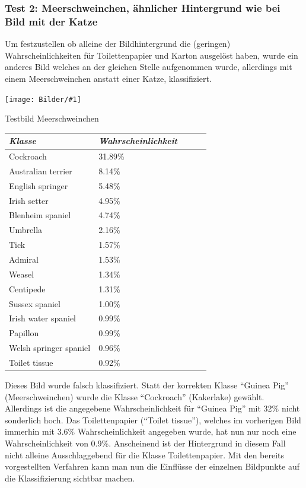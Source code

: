 \documentclass[
  12pt, %
  a4paper, %
  oneside, %
  openany, 
  numbers=noenddot, %
  BCOR=5mm, %
  parskip=half*, %
  thesis, %
]{bfhbook}
\newcommand{\imgText}[3]{
\begin{center}
    \begin{minipage}[t]{0.6\textwidth}
    		\vspace{0pt}
		\texttt{[image: Bilder/\#1]}
		\caption{#2}
	\end{minipage}\hfill
    \begin{minipage}[t]{0.4\textwidth}
    		\vspace{5pt}
  		#3
    \end{minipage}
\end{center}
}
\begin{document}
\subsubsection*{Test 2: Meerschweinchen, ähnlicher Hintergrund wie bei Bild mit der Katze}
Um festzustellen ob alleine der Bildhintergrund die (geringen) Wahrscheinlichkeiten für Toilettenpapier und Karton ausgelöst haben, wurde ein anderes Bild welches an der gleichen Stelle aufgenommen wurde, allerdings mit einem Meerschweinchen anstatt einer Katze, klassifiziert.
\imgText{IMG_2729.JPG}{Testbild Meerschweinchen}{

		\begin{tabular}{@{} *5l @{}}    \toprule
		\emph{Klasse} & \emph{Wahrscheinlichkeit} &&&  \\\midrule
		Cockroach & 31.89\% \\
		Australian terrier &  8.14\% \\
		English springer & 5.48\% \\
		Irish setter & 4.95\% \\
		Blenheim spaniel & 4.74\% \\
		Umbrella & 2.16\% \\
		Tick & 1.57\% \\
		Admiral & 1.53\% \\
		Weasel  & 1.34\% \\
		Centipede & 1.31\% \\
		Sussex spaniel & 1.00\% \\
		Irish water spaniel  & 0.99\% \\
		Papillon & 0.99\% \\
		Welsh springer spaniel  & 0.96\% \\
		Toilet tissue & 0.92\% \\ \bottomrule
		 \hline
		\end{tabular}
}
\break
Dieses Bild wurde falsch klassifiziert. Statt der korrekten Klasse ``Guinea Pig'' (Meerschweinchen) wurde die Klasse ``Cockroach'' (Kakerlake) gewählt. Allerdings ist die angegebene Wahrscheinlichkeit für ``Guinea Pig'' mit 32\% nicht sonderlich hoch. Das Toilettenpapier (``Toilet tissue''), welches im vorherigen Bild immerhin mit 3.6\% Wahrscheinlichkeit angegeben wurde, hat nun nur noch eine Wahrscheinlichkeit von 0.9\%.
\break
Anscheinend ist der Hintergrund in diesem Fall nicht alleine Ausschlaggebend für die Klasse Toilettenpapier. Mit den bereits vorgestellten Verfahren kann man nun die Einflüsse der einzelnen Bildpunkte auf die Klassifizierung sichtbar machen.
\end{document}
